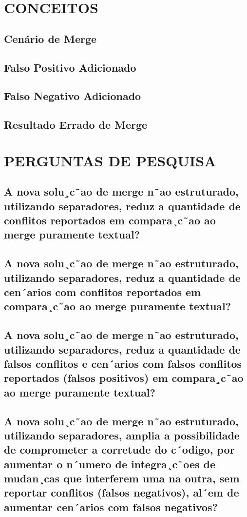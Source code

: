 \section{CONCEITOS}
\subsection{Cenário de Merge}
\subsection{Falso Positivo Adicionado}
\subsection{Falso Negativo Adicionado}
\subsection{Resultado Errado de Merge}

\section{PERGUNTAS DE PESQUISA}
\subsection{A nova solu¸c˜ao de merge n˜ao estruturado, utilizando separadores, reduz a quantidade de conflitos reportados em compara¸c˜ao
ao merge puramente textual?}
\subsection{A nova solu¸c˜ao de merge n˜ao estruturado, utilizando separadores, reduz a quantidade de cen´arios com conflitos reportados em
compara¸c˜ao ao merge puramente textual?}
\subsection{A nova solu¸c˜ao de merge n˜ao estruturado, utilizando separadores, reduz a quantidade de falsos conflitos e cen´arios com falsos
conflitos reportados (falsos positivos) em compara¸c˜ao ao merge
puramente textual?}
\subsection{A nova solu¸c˜ao de merge n˜ao estruturado, utilizando separadores, amplia a possibilidade de comprometer a corretude do
c´odigo, por aumentar o n´umero de integra¸c˜oes de mudan¸cas que
interferem uma na outra, sem reportar conflitos (falsos negativos), al´em de aumentar cen´arios com falsos negativos?}
